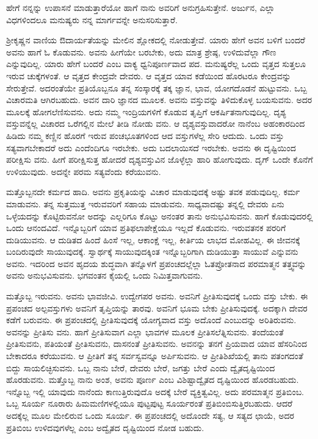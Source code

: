 {\small ಹೇಗೆ ನನ್ನನ್ನು ಉಪಾಸನೆ ಮಾಡುತ್ತಾರೆಯೋ ಹಾಗೆ ನಾನು ಅವರಿಗೆ ಅನುಗ್ರಹಿಸುತ್ತೇನೆ. ಅರ್ಜುನ, ಎಲ್ಲಾ ವಿಧಗಳಿಂದಲೂ ಮನುಷ್ಯರು ನನ್ನ ಮಾರ್ಗವನ್ನೇ ಅನುಸರಿಸುತ್ತಾರೆ.}

ಶ್ರೀಕೃಷ್ಣನ ವಾಣಿಯ ಔದಾರ್ಯತೆಯನ್ನು ಮೇಲಿನ ಶ್ಲೋಕದಲ್ಲಿ ನೋಡುತ್ತೇವೆ. ಯಾರು ಹೇಗೆ ಅವನ ಬಳಿಗೆ ಬಂದರೆ ಅವನು ಹಾಗೆ ಓ ಕೊಡುವನು. ಅವನು ಹೀಗೆಯೇ ಬರಬೇಕು, ಅದು ಮಾತ್ರ ಶ್ರೇಷ್ಠ, ಉಳಿದುವೆಲ್ಲಾ ಗೌಣ ಎನ್ನುವುದಿಲ್ಲ. ಯಾರು ಹೇಗೆ ಬಂದರೆ ಎಂಬ ವಾಕ್ಯ ಧ್ವನಿಪೂರ್ಣವಾದ ಪದ. ಮನುಷ್ಯರೆಲ್ಲ ಒಂದು ವೃತ್ತದ ಸುತ್ತಲೂ ಇರುವ ಚುಕ್ಕೆಗಳಂತೆ. ಆ ವೃತ್ತದ ಕೇಂದ್ರವೇ ದೇವರು. ಆ ವೃತ್ತದ ಯಾವ ಕಡೆಯಿಂದ ಹೊರಟರೂ ಕೇಂದ್ರವನ್ನು ಸೇರುತ್ತೇವೆ. ಅದರಂತೆಯೇ ಪ್ರತಿಯೊಬ್ಬನೂ ತನ್ನ ಸಂಸ್ಕಾರಕ್ಕೆ ತಕ್ಕ ಜ್ಞಾನ, ಭಾವ, ಯೋಗದೊಡನೆ ಹುಟ್ಟುವನು. ಒಬ್ಬ ವಿಚಾರಮತಿ ಆಗಿರಬಹುದು. ಅವನ ದಾರಿ ಜ್ಞಾನದ ಮೂಲಕ. ಅವನು ವಸ್ತುವನ್ನು ತಿಳಿದುಕೊಳ್ಳ ಬಯಸುವನು. ಅದರ ಮೂಲಕ್ಕೆ ಹೋಗಲೆಣಿಸುವನು. ಅದು ನಮ್ಮ ಇಂದ್ರಿಯಗಳಿಗೆ ಕೊಡುವ ತೃಪ್ತಿಗೆ ಆಕರ್ಷಿತನಾಗುವುದಿಲ್ಲ. ದೃಶ್ಯ ವಸ್ತುವನ್ನೆಲ್ಲ ವಿಚಾರದ ಒರೆಗಲ್ಲಿನ ಮೇಲೆ ತೀಡಿ ನೋಡು ವನು. ಆ ದೃಶ್ಯವಸ್ತುವಾದರೋ ನಾನೆಂಬ ಅಹಂಕಾರದಿಂದ ಹಿಡಿದು ನಮ್ಮ ಕಣ್ಣಿನ ಹೊರಗೆ ಇರುವ ಪಂಚಭೂತಗಳಿಂದ ಆದ ವಸ್ತುಗಳೆಲ್ಲ ಸೇರಿ ಆದುದು. ಒಂದು ವಸ್ತು ಸತ್ಯವಾಗಬೇಕಾದರೆ ಅದು ಎಂದೆಂದಿಗೂ ಇರಬೇಕು. ಅದು ಬದಲಾಯಿಸದೆ ಇರಬೇಕು. ಅವನು ಈ ದೃಷ್ಟಿಯಿಂದ ಪರೀಕ್ಷಿಸು ವನು. ಹೀಗೆ ಪರೀಕ್ಷಿಸುತ್ತ ಹೋದರೆ ದೃಶ್ಯವಸ್ತುವಿನ ಜೊಳ್ಳೆಲ್ಲಾ ಹಾರಿ ಹೋಗುವುದು. ದೃಗ್ ಒಂದೇ ಕೊನೆಗೆ ಉಳಿಯುವುದು. ಅದನ್ನೇ ಪರಮ ಸತ್ಯವೆಂದು ಕರೆಯುವನು.

ಮತ್ತೊಬ್ಬನದೇ ಕರ್ಮದ ಹಾದಿ. ಅವನು ಪ್ರಕೃತಿಯನ್ನು ವಿಚಾರ ಮಾಡುವುದಕ್ಕೆ ಅಷ್ಟು ತವಕ ಪಡುವುದಿಲ್ಲ. ಕರ್ಮ ಮಾಡುವನು. ತನ್ನ ಸುತ್ತಮುತ್ತ ಇರುವವರಿಗೆ ಸಹಾಯ ಮಾಡುವನು. ಸಾಧ್ಯವಾದಷ್ಟು ತನ್ನಲ್ಲಿ ದೇವರು ಏನು ಒಳ್ಳೆಯದನ್ನು ಕೊಟ್ಟಿರುವನೋ ಅದನ್ನು ಎಲ್ಲರಿಗೂ ಕೊಟ್ಟು ಅನಂತರ ತಾನು ಅನುಭವಿಸುವನು. ಹಾಗೆ ಕೊಡುವುದರಲ್ಲಿ ಒಂದು ಆನಂದವಿದೆ. ಇನ್ನೊಬ್ಬರಿಗೆ ಯಾವ ಪ್ರತಿಫಲಾಪೇಕ್ಷೆಯೂ ಇಲ್ಲದೆ ಕೊಡುವನು. ಇರುವತನಕ ಪರರಿಗೆ ದುಡಿಯುವನು. ಆ ದುಡಿತದ ಹಿಂದೆ ಹಿಂಸೆ ಇಲ್ಲ, ಆಕಾಂಕ್ಷೆ ಇಲ್ಲ, ಕೀರ್ತಿಯ ಲಾಭದ ಮೋಹವಿಲ್ಲ. ಈ ಜೀವನಕ್ಕೆ ಬಂದಿರುವುದೇ ಸಾಯುವುದಕ್ಕೆ. ಸ್ವಾರ್ಥಕ್ಕೆ ಸಾಯುವುದಕ್ಕಿಂತ ಇನ್ನೊಬ್ಬರಿಗಾಗಿ ದುಡಿಯುತ್ತಾ ಸಾಯುವೆ ಎನ್ನುವನು ಅವನು. ಇದರಿಂದ ಅವನ ಹೃದಯ ಶುದ್ಧವಾಗಿ ತನ್ನೊಳಗೆ ಪ್ರಪಂಚದಲ್ಲೆಲ್ಲಾ ಓತಪ್ರೋತನಾದ ಪರಮಾತ್ಮನ ತತ್ತ್ವವನ್ನು ಅವನು ಅನುಭವಿಸುವನು. ಭಗವಂತನ ಕೈಯಲ್ಲಿ ಒಂದು ನಿಮಿತ್ತವಾಗುವನು.

ಮತ್ತೊಬ್ಬ ಇರುವನು. ಅವನು ಭಾವಜೀವಿ. ಉದ್ವೇಗಪರ ಅವನು. ಅವನಿಗೆ ಪ್ರೀತಿಸುವುದಕ್ಕೆ ಒಂದು ವಸ್ತು ಬೇಕು. ಈ ಪ್ರಪಂಚದ ಅಲ್ಪವಸ್ತುಗಳು ಅವನಿಗೆ ತೃಪ್ತಿಯನ್ನು ತಾರವು. ಅವನಿಗೆ ಭೂಮ ಬೇಕು ಪ್ರೀತಿಸುವುದಕ್ಕೆ. ಅದಕ್ಕಾಗಿ ದೇವರ ಕಡೆಗೆ ಬರುವನು. ಈ ಪ್ರಪಂಚದಲ್ಲಿ ಪ್ರೀತಿಸುವುದಕ್ಕೆ ಯೋಗ್ಯವಾದ ವಸ್ತು ಅದೊಂದೆ ಎಂಬುದನ್ನು ಅರಿತಿರುವನು. ಅವನನ್ನು ಪ್ರೀತಿಸು ವನು. ಹಾಗೆ ಪ್ರೀತಿಸುವಾಗ ಎಲ್ಲಾ ಭಾವಗಳ ಮೂಲಕ ಪ್ರೀತಿಸಲೆತ್ನಿಸುವನು. ತಂದೆಯಂತೆ ಪ್ರೀತಿಸುವನು, ಪತಿಯಂತೆ ಪ್ರೀತಿಸುವನು, ದಾಸನಂತೆ ಪ್ರೀತಿಸುವನು. ಅವನನ್ನು ತನಗೆ ಪ್ರಿಯವಾದ ಯಾವ ಹೆಸರಿನಿಂದ ಬೇಕಾದರೂ ಕರೆಯುವನು. ಆ ಪ್ರೀತಿಗೆ ತನ್ನ ಸರ್ವಸ್ವವನ್ನೂ ಅರ್ಪಿಸುವನು. ಆ ಪ್ರೀತಿಶಿಖೆಯಲ್ಲಿ ತಾನು ಪತಂಗದಂತೆ ಬಿದ್ದು ಸಾಯಲಿಚ್ಛಿಸುವನು. ಒಬ್ಬ ನಾನು ಬೇರೆ, ದೇವರು ಬೇರೆ, ಜಗತ್ತು ಬೇರೆ ಎಂದು ದ್ವೈತದೃಷ್ಟಿಯಿಂದ ಹೊರಡುವನು. ಮತ್ತೊಬ್ಬ ನಾನು ಅಂಶ, ಅವನು ಪೂರ್ಣ ಎಂಬ ವಿಶಿಷ್ಟಾದ್ವೈತದ ದೃಷ್ಟಿಯಿಂದ ಹೊರಡಬಹುದು. ಇನ್ನೊಬ್ಬ ಇಲ್ಲಿ ಯಾವುದು ನಾನೆಂದು ಕಾಣುತ್ತಿರುವುದೊ ಅದಕ್ಕೆ ಬೇರೆ ವ್ಯಕ್ತಿತ್ವವಿಲ್ಲ. ಅದು ಪರಮಾತ್ಮನ ಪ್ರತಿಬಿಂಬ. ಒಬ್ಬ ಸೂರ್ಯ ನೂರಾರು ಹಿಮಮಣಿಗಳಲ್ಲಿಯೂ ಪುಟ್ಟಪುಟ್ಟ ಸೂರ್ಯರಂತೆ ಪ್ರತಿಬಿಂಬಿಸುತ್ತಿರಬಹುದು. ಆದರೆ ಅದಕ್ಕೆಲ್ಲ ಮೂಲ ಮೇಲಿರುವ ಒಂದು ಸೂರ್ಯ. ಈ ಪ್ರಪಂಚದಲ್ಲಿ ಅದೊಂದೇ ಸತ್ಯ, ಆ ಸತ್ಯದ ಛಾಯೆ, ಅದರ ಪ್ರತಿಬಿಂಬ ಉಳಿದವುಗಳೆಲ್ಲ ಎಂಬ ಅದ್ವೈತದ ದೃಷ್ಟಿಯಿಂದ ನೋಡ ಬಹುದು.


